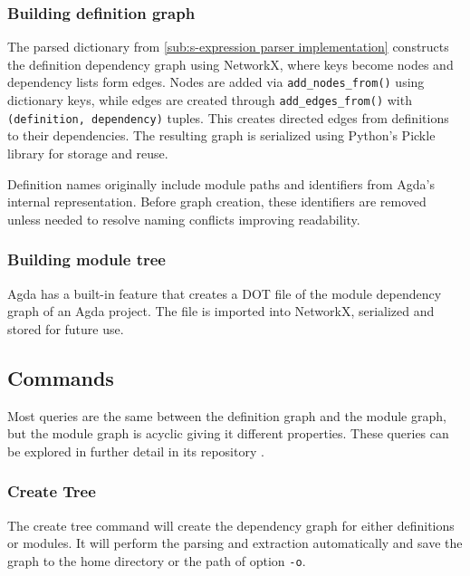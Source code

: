 \subsubsection{Building definition graph}

The parsed dictionary from \cref{sub:s-expression parser implementation}
constructs the definition dependency graph using NetworkX, where keys become
nodes and dependency lists form edges. Nodes are added via
\texttt{add\_nodes\_from()} using dictionary keys, while edges are created
through \texttt{add\_edges\_from()} with \texttt{(definition, dependency)}
tuples. This creates directed edges from definitions to their dependencies. The
resulting graph is serialized using Python's Pickle library for storage and
reuse.

Definition names originally include module paths and identifiers from Agda's
internal representation. Before graph creation, these identifiers are removed
unless needed to resolve naming conflicts improving readability.

\subsubsection{Building module tree} \label{sub: Building Module Tree}

Agda has a built-in feature that creates a DOT file of the module dependency
graph of an Agda project. The file is imported into NetworkX, serialized and
stored for future use.

\subsection{Commands}

Most queries are the same between the definition graph and the module graph,
but the module graph is acyclic giving it different properties. These queries
can be explored in further detail in its repository \cite{agda_html}.


\subsubsection{Create Tree}

The create tree command will create the dependency graph for either definitions
or modules. It will perform the parsing and extraction automatically and save
the graph to the home directory or the path of option \texttt{-o}.

